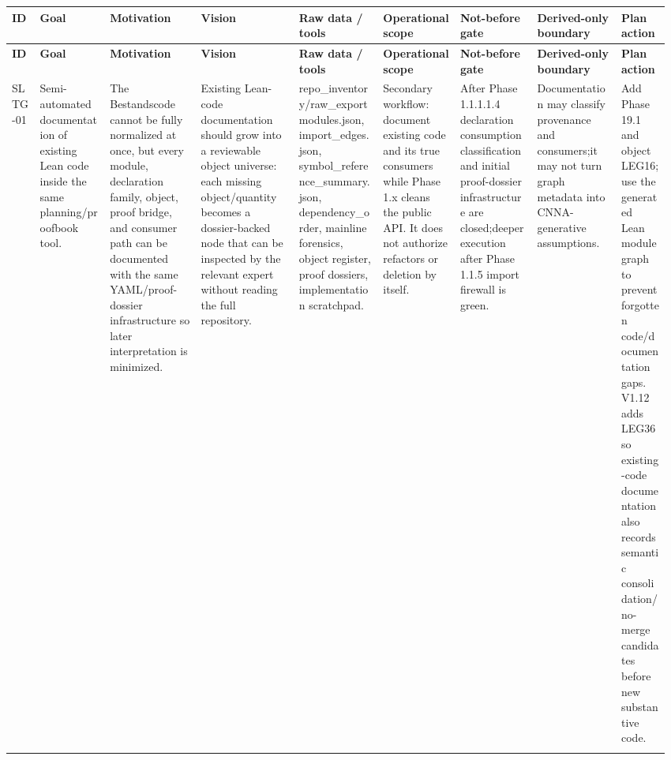\footnotesize
{}
\begin{longtable}{L{0.04\linewidth} L{0.105\linewidth} L{0.135\linewidth} L{0.145\linewidth} L{0.12\linewidth} L{0.115\linewidth} L{0.115\linewidth} L{0.12\linewidth} L{0.075\linewidth}}
\hline
\textbf{ID} & \textbf{Goal} & \textbf{Motivation} & \textbf{Vision} & \textbf{Raw data /\allowbreak{} tools} & \textbf{Operational scope} & \textbf{Not-before gate} & \textbf{Derived-only boundary} & \textbf{Plan action}\\
\hline
\endfirsthead
\hline
\textbf{ID} & \textbf{Goal} & \textbf{Motivation} & \textbf{Vision} & \textbf{Raw data /\allowbreak{} tools} & \textbf{Operational scope} & \textbf{Not-before gate} & \textbf{Derived-only boundary} & \textbf{Plan action}\\
\hline
\endhead
SLTG-01 & Semi-automated documentation of existing Lean code inside the same planning/\allowbreak{}proofbook tool. & The Bestandscode cannot be fully normalized at once, but every module, declaration family, object, proof bridge, and consumer path can be documented with the same YAML/\allowbreak{}proof-dossier infrastructure so later interpretation is minimized. & Existing Lean-code documentation should grow into a reviewable object universe: each missing object/\allowbreak{}quantity becomes a dossier-backed node that can be inspected by the relevant expert without reading the full repository. & repo\_inventory/\allowbreak{}raw\_export modules.json, import\_edges.json, symbol\_reference\_summary.json, dependency\_order, mainline forensics, object register, proof dossiers, implementation scratchpad. & Secondary workflow: document existing code and its true consumers while Phase 1.x cleans the public API. It does not authorize refactors or deletion by itself. & After Phase 1.1.1.1.4 declaration consumption classification and initial proof-dossier infrastructure are closed;\newline deeper execution after Phase 1.1.5 import firewall is green. & Documentation may classify provenance and consumers;\newline it may not turn graph metadata into CNNA-generative assumptions. & Add Phase 19.1 and object LEG16;\newline use the generated Lean module graph to prevent forgotten code/\allowbreak{}documentation gaps. V1.12 adds LEG36 so existing-code documentation also records semantic consolidation/\allowbreak{}no-merge candidates before new substantive code.\\
\hline
\addlinespace[0.24em]

\end{longtable}
